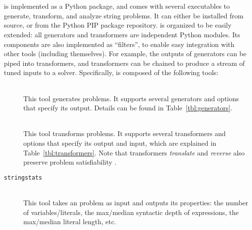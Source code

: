 \section{\fuzzer{}}
\label{sec:fuzzer}

\fuzzer{} is implemented as a Python package, and comes with several
executables to generate, transform, and analyze \smtfull{} string
problems. It can either be installed from source, or from the Python
PIP package repository. \fuzzer{} is organized to be easily extended:
all generators and transformers are independent Python modules. Its
components are also implemented as \unix{} ``filters'', to enable easy
integration with other tools (including themselves). For example, the
outputs of generators can be piped into transformers, and transformers
can be chained to produce a stream of tuned inputs to a
solver. Specifically, \fuzzer{} is composed of the following tools:
\begin{description}
    \item[\generator{}] \hfill \\
        This tool generates \smt{} problems. It supports several generators and
        options that specify its output. Details can be found in
        Table~\ref{tbl:generators}.
    \item[\transformer{}] \hfill \\
        This tool transforms \smt{}
        problems. It supports several transformers and options that specify
        its output and input, which are explained in
        Table~\ref{tbl:transformers}. Note that transformers
        \textit{translate} and \textit{reverse} also preserve problem
        satisfiability \cite{ifaz}.
    \item[\texttt{stringstats}] \hfill \\
        This tool takes an \smt{}
        problem as input and outputs its properties: the number of
        variables/literals, the max/median syntactic depth of expressions, the
        max/median literal length, etc.
\end{description}

